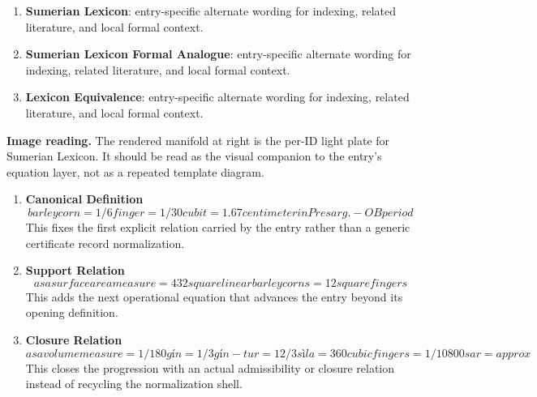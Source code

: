 \begin{enumerate}[leftmargin=1.6em,itemsep=6pt,topsep=4pt]
\item \textbf{Sumerian Lexicon}: entry-specific alternate wording for indexing, related literature, and local formal context.
\item \textbf{Sumerian Lexicon Formal Analogue}: entry-specific alternate wording for indexing, related literature, and local formal context.
\item \textbf{Lexicon Equivalence}: entry-specific alternate wording for indexing, related literature, and local formal context.
\end{enumerate}

\begin{samepage}
\noindent\begin{minipage}[t]{0.45\linewidth}
\vspace{0pt}
\raggedright
\scriptsize\textbf{Image reading.} The rendered manifold at right is the per-ID light plate for Sumerian Lexicon. It should be read as the visual companion to the entry's equation layer, not as a repeated template diagram.\par
\end{minipage}\hfill
\begin{minipage}[t]{0.53\linewidth}
\vspace*{-0.10in}
\raggedright
{}
\end{minipage}
\end{samepage}

\clearpage


\begin{enumerate}[leftmargin=1.6em,itemsep=9pt,topsep=6pt]
\item \textbf{Canonical Definition}
\[
barleycorn = 1/6 finger = 1/30 cubit = 1.67 centimeter in Presarg.-OB period
\]
This fixes the first explicit relation carried by the entry rather than a generic certificate record normalization.

\item \textbf{Support Relation}
\[
as a surface area measure = 432 square linear barleycorns = 12 square fingers
\]
This adds the next operational equation that advances the entry beyond its opening definition.

\item \textbf{Closure Relation}
\[
as a volume measure = 1/180 gín = 1/3 gín-tur = 1 2/3 sìla = 360 cubic fingers = 1/10800 sar = approx
\]
This closes the progression with an actual admissibility or closure relation instead of recycling the normalization shell.
\end{enumerate}

